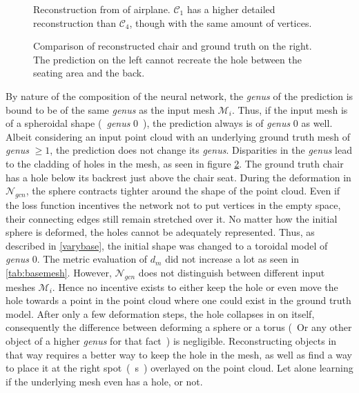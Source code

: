   \begin{figure}[htbp]
    \centering
    \caption{Reconstruction from of airplane. $\mathcal{C}_1$ has a higher detailed reconstruction than $\mathcal{C}_4$, though with the same amount of vertices.} \label{fig:simpleairplanes}
  \end{figure}
  \begin{figure}[htbp]
    \centering
    \caption{Comparison of reconstructed chair and ground truth on the right. The prediction on the left cannot recreate the hole between the seating area and the back.} \label{fig:chairsclad}
  \end{figure}
  By nature of the composition of the neural network, the \emph{genus} of the prediction is bound to be of the same \emph{genus} as the input mesh 
  $\mathcal{M}_i$. Thus, if the input mesh is of a spheroidal shape (~\emph{genus} 0~), the prediction always is of \emph{genus} 0 as well.
  Albeit considering an input point cloud with an underlying ground truth mesh of \emph{genus} $\geq 1$, the prediction does not change its \emph{genus}.
  Disparities in the \emph{genus} lead to the cladding of holes in the mesh, as seen in figure \ref{fig:chairsclad}. The ground truth chair has a hole
  below its backrest just above the chair seat. During the deformation in $\mathcal{N}_{gcn}$, the sphere contracts tighter around the shape of the point
  cloud. Even if the loss function incentives the network not to put vertices in the empty space, their connecting edges still remain stretched over it.
  No matter how the initial sphere is deformed, the holes cannot be adequately represented. 
  Thus, as described in \ref{varybase}, the initial shape was changed to a toroidal model of \emph{genus} 0. The metric evaluation of $d_m$ did not increase 
  a lot as seen in \ref{tab:basemesh}. However, $\mathcal{N}_{gcn}$ does not distinguish between different input meshes $\mathcal{M}_i$. Hence no incentive
  exists to either keep the hole or even move the hole towards a point in the point cloud where one could exist in the ground truth model. After only a few 
  deformation steps, the hole collapses in on itself, consequently the difference between deforming a sphere or a torus (~Or any other object of a higher
  \emph{genus} for that fact~) is negligible. 
  Reconstructing objects in that way requires a better way to keep the hole in the mesh, as well as find a way to place it at the right spot~(~s~) overlayed 
  on the point cloud. Let alone learning if the underlying mesh even has a hole, or not.

